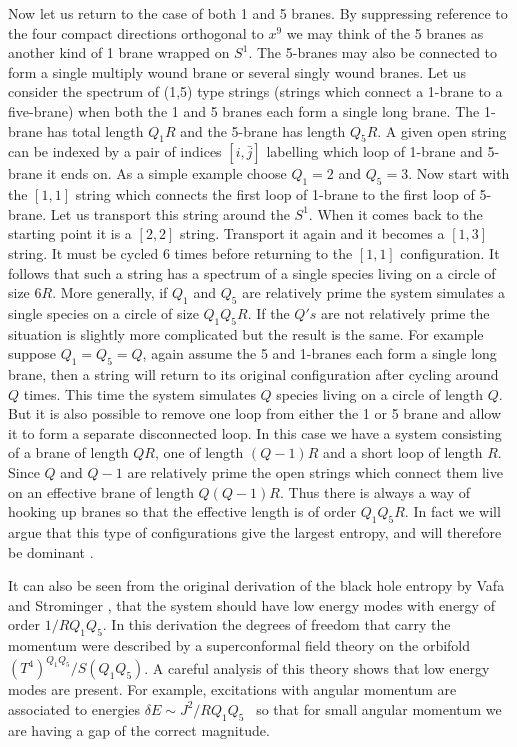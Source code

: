 Now let us return to the case of both 1 and 5 branes. By suppressing
reference
to
the four compact directions orthogonal to $x^9$ we may think of
the 5 branes
as
another kind of 1 brane wrapped on $S^1$. The 5-branes
 may also be connected
to
form a single multiply wound brane or several singly wound branes. Let us
consider the spectrum
 of (1,5) type strings (strings which connect a 1-brane
to
a five-brane) when both the 1 and 5 branes each
form a single long brane. The 1-brane has total length $Q_1 R$ and the
5-brane
has length $Q_5 R$. A given open string can be indexed by a pair of indices
$[i,\bar j]$ 
labelling which loop of 1-brane and 5-brane it ends on. As a
simple
example choose $Q_1=2$ and $Q_5=3$. Now start with the $[1,1]$ string which
connects the first loop of 1-brane to the first loop  of 5-brane. Let us
transport this string around the $S^1$. When it comes back to the starting
point
it is a $[2,2]$ string. Transport it again and it becomes a $[1,3]$
 string.
It
must be cycled 6 times before returning to the $[1,1]$ configuration. It
follows
that such a string has a spectrum of a single species living on a circle of
size
$6R$. More generally, if $Q_1$ and $Q_5$ are relatively prime the system
simulates a single species
 on a circle of size $Q_1 Q_5 R$. If the $Q's$ are
not
relatively prime the situation is slightly
more complicated but the result is the same.  For example  suppose
$Q_1 = Q_5 =Q$,  again  assume the 5 and 1-branes each form a single long
brane,
then a string will return to its original configuration after
cycling
around $Q$ times. This time the system simulates $Q$ species living
on
a
circle of length $Q$. But  it is also possible to remove one loop from
either
the 1 or 5 brane and allow it to form a separate disconnected  loop. In this
case we have a system consisting of a brane of length $QR$, one of length
$(Q-1)R$ and a short loop of length $R$. Since $Q$ and $Q-1$ are relatively
prime the open strings which connect them live on an effective brane of
length
$Q(Q-1)R$. Thus there is always a way of hooking up branes so that the
effective length is of order $Q_1 Q_5 R$. In fact we will argue
that this type of configurations give the largest entropy, and will
therefore be dominant \sm .


It can also be seen from the original derivation
of the black hole entropy by
Vafa and Strominger \sv , that the system should have low
energy modes with energy of order $ 1/R Q_1 Q_5 $.
In this derivation  the degrees of freedom that
carry  the momentum were described by a superconformal
field theory on the orbifold $(T^4)^{Q_1 Q_5} /S(Q_1 Q_5)$.
A careful analysis of this theory shows that  low
energy modes are present.
For example, excitations with  angular momentum
are associated to energies $ \delta E \sim J^2/R Q_1 Q_5$ \spn 
\vbd\ so that
for small angular momentum we are having  a gap of the correct 
magnitude. 


